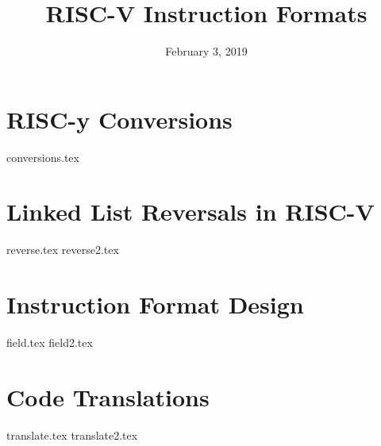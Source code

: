 \documentclass[11pt]{exam}
\title{RISC-V Instruction Formats}
\date{February 3, 2019}
\begin{document}
\maketitle

\section{RISC-y Conversions}
\begin{questions}
{conversions.tex}
\end{questions}
\newpage

\section{Linked List Reversals in RISC-V}
\begin{questions}
{reverse.tex}
{reverse2.tex}
\end{questions}
\newpage

\section{Instruction Format Design}
\begin{questions}
{field.tex}
{field2.tex}
\end{questions}
\newpage

\section{Code Translations}
\begin{questions}
{translate.tex}
{translate2.tex}
\end{questions}
\newpage
\end{document}
